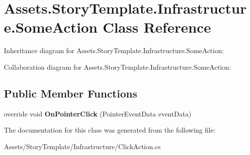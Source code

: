 \hypertarget{classAssets_1_1StoryTemplate_1_1Infrastructure_1_1SomeAction}{}\section{Assets.\+Story\+Template.\+Infrastructure.\+Some\+Action Class Reference}
\label{classAssets_1_1StoryTemplate_1_1Infrastructure_1_1SomeAction}


Inheritance diagram for Assets.\+Story\+Template.\+Infrastructure.\+Some\+Action\+:


Collaboration diagram for Assets.\+Story\+Template.\+Infrastructure.\+Some\+Action\+:
\subsection*{Public Member Functions}
\begin{DoxyCompactItemize}
\item 
override void {\bfseries On\+Pointer\+Click} (Pointer\+Event\+Data event\+Data)\hypertarget{classAssets_1_1StoryTemplate_1_1Infrastructure_1_1SomeAction_aeecffe0a11521024b33b8fba1a739e19}{}\label{classAssets_1_1StoryTemplate_1_1Infrastructure_1_1SomeAction_aeecffe0a11521024b33b8fba1a739e19}

\end{DoxyCompactItemize}


The documentation for this class was generated from the following file\+:\begin{DoxyCompactItemize}
\item 
Assets/\+Story\+Template/\+Infrastructure/Click\+Action.\+cs\end{DoxyCompactItemize}
